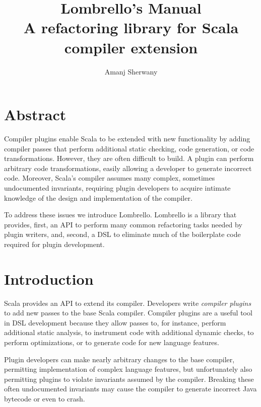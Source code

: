 \documentclass{article}
\begin{document}
\setlength{\pdfpageheight}{\paperheight}
\setlength{\pdfpagewidth}{\paperwidth}

\title{
 Lombrello's Manual\\
 \small{A refactoring library for Scala compiler extension}
}
  
\author{Amanj Sherwany} 


  


\maketitle

\section{Abstract}

Compiler plugins enable Scala to be extended with new functionality by adding
compiler passes that perform additional static checking, code generation, or
code transformations. However, they are often difficult to build. A plugin can
perform arbitrary code transformations, easily allowing a developer to generate
incorrect code. Moreover, Scala's compiler assumes many complex, sometimes
undocumented invariants, requiring plugin developers to acquire intimate
knowledge of the design and implementation of the compiler.  

To address these issues we introduce Lombrello. Lombrello is a library that
provides, first, an API to perform many common refactoring tasks needed by
plugin writers, and, second, a DSL to eliminate much of the boilerplate code
required for plugin development. 


\section{Introduction}

Scala provides an API to extend its compiler.  Developers write \emph{compiler
  plugins} to add new passes to the base Scala compiler.  Compiler plugins are
a useful tool in DSL development because they allow passes to, for instance,
perform additional static analysis, to instrument code with additional dynamic
checks, to perform optimizations, or to generate code for new language
features.

Plugin developers can make nearly arbitrary changes to the base compiler,
permitting implementation of complex language features, but unfortunately also
permitting plugins to violate invariants assumed by the compiler.  Breaking
these often undocumented invariants may cause the compiler to generate
incorrect Java bytecode or even to crash.
\end{document}
